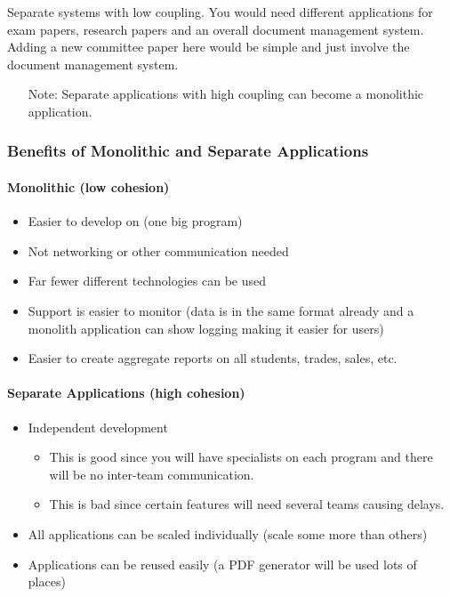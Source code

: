 Separate systems with low coupling.
You would need different applications for exam papers, research papers and an overall document management system.
Adding a new committee paper here would be simple and just involve the document management system.

\begin{note}
	\begin{itemize}
		\item[Note:] Separate applications with high coupling can become a monolithic application.
	\end{itemize}
\end{note}

\subsubsection{Benefits of Monolithic and Separate Applications}\label{ssub:benefits_of_monolithic_and_separate_applications}

\paragraph{Monolithic (low cohesion)}\label{par:monolithic_low_cohesion_}

\begin{itemize}
	\item Easier to develop on (one big program)
	\item Not networking or other communication needed
	\item Far fewer different technologies can be used
	\item Support is easier to monitor (data is in the same format already and a monolith application can show logging making it easier for users)
	\item Easier to create aggregate reports on all students, trades, sales, etc.
\end{itemize}

\paragraph{Separate Applications (high cohesion)}\label{par:separate_applications_high_cohesion_}

\begin{itemize}
	\item Independent development
	      \begin{itemize}
		      \item This is good since you will have specialists on each program and there will be no inter-team communication.
		      \item This is bad since certain features will need several teams causing delays.
	      \end{itemize}
	\item All applications can be scaled individually (scale some more than others)
	\item Applications can be reused easily (a PDF generator will be used lots of places)
\end{itemize}

